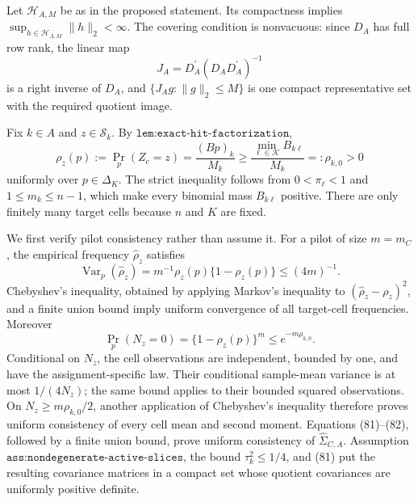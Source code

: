 Let \(\mathscr H_{A,M}\) be as in the proposed statement.  Its compactness implies \(\sup_{h\in\mathscr H_{A,M}}\lVert h\rVert_2<\infty\).  The covering condition is nonvacuous: since \(D_A\) has full row rank, the linear map
\[
J_A=D_A^{\prime}(D_AD_A^{\prime})^{-1}
\]
is a right inverse of \(D_A\), and \(\{J_Ag:\lVert g\rVert_2\leq M\}\) is one compact representative set with the required quotient image.

Fix \(k\in A\) and \(z\in\mathcal S_k\).  By \(\texttt{lem:exact-hit-factorization}\),
\[
\rho_z(p):=\Pr_p(Z_c=z)=\frac{(Bp)_k}{M_k}
\geq \frac{\min_{\ell\in\mathcal K}B_{k\ell}}{M_k}
=:\rho_{k,0}>0                                                   \tag{81}
\]
uniformly over \(p\in\Delta_K\).  The strict inequality follows from \(0<\pi_\ell<1\) and \(1\leq m_k\leq n-1\), which make every binomial mass \(B_{k\ell}\) positive.  There are only finitely many target cells because \(n\) and \(K\) are fixed.

We first verify pilot consistency rather than assume it.  For a pilot of size \(m=m_C\), the empirical frequency \(\widehat\rho_z\) satisfies
\[
\operatorname{Var}_p(\widehat\rho_z)
=m^{-1}\rho_z(p)\{1-\rho_z(p)\}\leq(4m)^{-1}.
\]
Chebyshev's inequality, obtained by applying Markov's inequality to \((\widehat\rho_z-\rho_z)^2\), and a finite union bound imply uniform convergence of all target-cell frequencies.  Moreover
\[
\Pr_p(N_z=0)=\{1-\rho_z(p)\}^{m}
\leq e^{-m\rho_{k,0}}.                                           \tag{82}
\]
Conditional on \(N_z\), the cell observations are independent, bounded by one, and have the assignment-specific law.  Their conditional sample-mean variance is at most \(1/(4N_z)\); the same bound applies to their bounded squared observations.  On \(N_z\geq m\rho_{k,0}/2\), another application of Chebyshev's inequality therefore proves uniform consistency of every cell mean and second moment.  Equations (81)--(82), followed by a finite union bound, prove uniform consistency of \(\widehat\Sigma_{C,A}\).  Assumption \(\texttt{ass:nondegenerate-active-slices}\), the bound \(\tau_k^2\leq1/4\), and (81) put the resulting covariance matrices in a compact set whose quotient covariances are uniformly positive definite.

